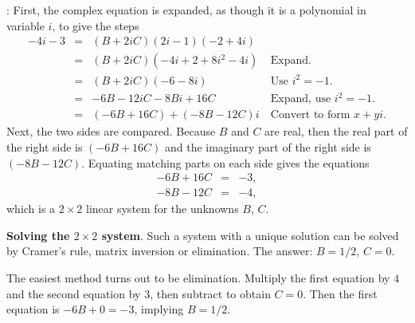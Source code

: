 \documentclass{article}
\def\df{\bfseries}
\def\BF#1{{\df #1}}
\newenvironment{Solution}{\par\noindent{\sffamily\bfseries\upshape Solution}:\small\rm}{\par\medskip}
\begin{document}
\begin{Solution}
First, the complex equation is expanded, as though it is a
polynomial in variable $i$, to give the steps
$$
 \begin{array}{lcll}
-4i-3 &=& (B+2iC)(2i-1)(-2+4i)   & ~\mbox{}
      \\
      &=& (B+2iC)(-4i+2+8i^2-4i) & ~\mbox{Expand.}
      \\
      &=& (B+2iC)(-6-8i)         & ~\mbox{Use $i^2=-1$.}
      \\
      &=& -6B-12iC-8Bi+16C       & ~\mbox{Expand, use $i^2=-1$.}
      \\
      &=& (-6B+16C)+(-8B-12C)i   & ~\mbox{Convert to form $x+yi$.}
\end{array}
$$
Next, the two sides are compared. Because $B$ and $C$ are real,
then the real part of the right side is $(-6B+16C)$ and the
imaginary part of the right side is $(-8B-12C)$. Equating matching
parts on each side gives the equations
$$
\begin{array}{lcl}
 -6B+16C &=& -3, \\
 -8B-12C &=& -4,
 \end{array}
$$
which is a $2\times 2$ linear system for the unknowns $B$, $C$.

\BF{Solving the $2\times 2$ system}. Such a system with a unique
solution can be solved by Cramer's rule, matrix inversion or
elimination. The answer: $B=1/2$, $C=0$.

The easiest method turns out to be elimination. Multiply the first
equation by $4$ and the second equation by $3$, then subtract to
obtain $C=0$. Then the first equation is $-6B+0=-3$, implying
$B=1/2$.

\end{Solution}
\end{document}
